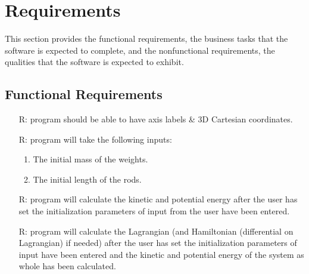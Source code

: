 \documentclass[12pt]{article}
\newcounter{reqnum} %
\begin{document}
\newpage
\section{Requirements}

This section provides the functional requirements, the business tasks that the
software is expected to complete, and the nonfunctional requirements, the
qualities that the software is expected to exhibit.


\subsection{Functional Requirements}

\noindent \begin{itemize}

\item[R\refstepcounter{reqnum}\thereqnum \label{funinput}:] \progname 
program should be able to have axis labels \& 3D Cartesian coordinates. 

\item[R\refstepcounter{reqnum}\thereqnum \label{funinput}:] \progname program 
  will take the following inputs: 
  \begin{enumerate} \item The initial mass of the weights. 
                    \item The initial length of the rods.
  \end{enumerate}
                    
\item[R\refstepcounter{reqnum}\thereqnum \label{funkinpot}:] \progname program 
will calculate the kinetic and potential energy after the user has set the 
initialization parameters of input from the user have been entered.

\item[R\refstepcounter{reqnum}\thereqnum \label{funlagham}:] \progname program 
will calculate the Lagrangian (and Hamiltonian (differential on Lagrangian) 
if needed) after the user has set the initialization parameters of input 
have been entered and the kinetic and potential energy of the system as whole 
has been calculated. 


\end{itemize}
\end{document}
